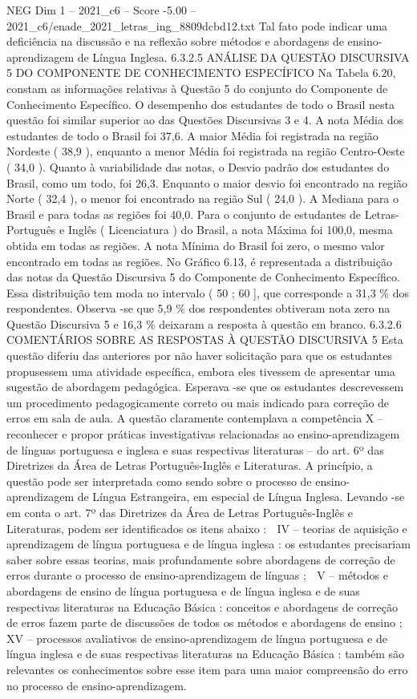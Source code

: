 \begin{textsample}{NEG Dim 1 – 2021\_c6 – Score -5.00 – 2021\_c6/enade\_2021\_letras\_ing\_8809dcbd12.txt}
Tal fato pode indicar uma deficiência na discussão e na reflexão sobre métodos e abordagens de ensino-aprendizagem de Língua Inglesa. 6.3.2.5 ANÁLISE DA QUESTÃO DISCURSIVA 5 DO COMPONENTE DE CONHECIMENTO ESPECÍFICO Na Tabela 6.20, constam as informações relativas à Questão 5 do conjunto do Componente de Conhecimento Específico.
O desempenho dos estudantes de todo o Brasil nesta questão foi similar superior ao das Questões Discursivas 3 e 4.
A nota Média dos estudantes de todo o Brasil foi 37,6.
A maior Média foi registrada na região Nordeste ( 38,9 ), enquanto a menor Média foi registrada na região Centro-Oeste ( 34,0 ).
Quanto à variabilidade das notas, o Desvio padrão dos estudantes do Brasil, como um todo, foi 26,3.
Enquanto o maior desvio foi encontrado na região Norte ( 32,4 ), o menor foi encontrado na região Sul ( 24,0 ).
A Mediana para o Brasil e para todas as regiões foi 40,0.
Para o conjunto de estudantes de Letras-Português e Inglês ( Licenciatura ) do Brasil, a nota Máxima foi 100,0, mesma obtida em todas as regiões.
A nota Mínima do Brasil foi zero, o mesmo valor encontrado em todas as regiões.
No Gráfico 6.13, é representada a distribuição das notas da Questão Discursiva 5 do Componente de Conhecimento Específico.
Essa distribuição tem moda no intervalo ( 50 ; 60 ], que corresponde a 31,3 \% dos respondentes.
Observa -se que 5,9 \% dos respondentes obtiveram nota zero na Questão Discursiva 5 e 16,3 \% deixaram a resposta à questão em branco. 6.3.2.6 COMENTÁRIOS SOBRE AS RESPOSTAS À QUESTÃO DISCURSIVA 5 Esta questão diferiu das anteriores por não haver solicitação para que os estudantes propusessem uma atividade específica, embora eles tivessem de apresentar uma sugestão de abordagem pedagógica.
Esperava -se que os estudantes descrevessem um procedimento pedagogicamente correto ou mais indicado para correção de erros em sala de aula.
A questão claramente contemplava a competência X – reconhecer e propor práticas investigativas relacionadas ao ensino-aprendizagem de línguas portuguesa e inglesa e suas respectivas literaturas – do art. 6º das Diretrizes da Área de Letras Português-Inglês e Literaturas.
A princípio, a questão pode ser interpretada como sendo sobre o processo de ensino-aprendizagem de Língua Estrangeira, em especial de Língua Inglesa.
Levando -se em conta o art. 7º das Diretrizes da Área de Letras Português-Inglês e Literaturas, podem ser identificados os itens abaixo :  IV – teorias de aquisição e aprendizagem de língua portuguesa e de língua inglesa : os estudantes precisariam saber sobre essas teorias, mais profundamente sobre abordagens de correção de erros durante o processo de ensino-aprendizagem de línguas ;  V – métodos e abordagens de ensino de língua portuguesa e de língua inglesa e de suas respectivas literaturas na Educação Básica : conceitos e abordagens de correção de erros fazem parte de discussões de todos os métodos e abordagens de ensino ;  XV – processos avaliativos de ensino-aprendizagem de língua portuguesa e de língua inglesa e de suas respectivas literaturas na Educação Básica : também são relevantes os conhecimentos sobre esse item para uma maior compreensão do erro no processo de ensino-aprendizagem.

\end{textsample}

